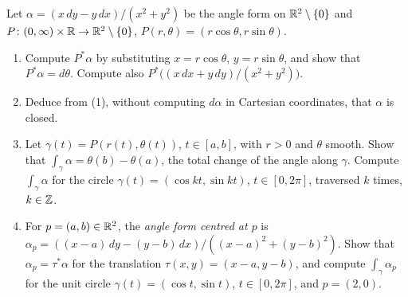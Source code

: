 \begin{exercise}\label{differential-forms:exercise-angle-form-polar}
Let $\alpha = (x\,dy - y\,dx)/(x^2 + y^2)$ be the angle form on $\mathbb{R}^2 \setminus \{0\}$ and $P \colon (0, \infty) \times \mathbb{R} \to \mathbb{R}^2 \setminus \{0\}$, $P(r, \theta) = (r\cos\theta, r\sin\theta)$.
\begin{enumerate}
\item Compute $P^*\alpha$ by substituting $x = r\cos\theta$, $y = r\sin\theta$, and show that $P^*\alpha = d\theta$. Compute also $P^*\bigl((x\,dx + y\,dy)/(x^2 + y^2)\bigr)$.
\item Deduce from (1), without computing $d\alpha$ in Cartesian coordinates, that $\alpha$ is closed.
\item Let $\gamma(t) = P(r(t), \theta(t))$, $t \in [a, b]$, with $r > 0$ and $\theta$ smooth. Show that $\int_\gamma\alpha = \theta(b) - \theta(a)$, the total change of the angle along $\gamma$. Compute $\int_\gamma\alpha$ for the circle
$\gamma(t) = (\cos kt, \sin kt)$, $t \in [0, 2\pi]$, traversed $k$ times, $k \in \mathbb{Z}$.
\item For $p = (a, b) \in \mathbb{R}^2$, the \emph{angle form centred at $p$} is $\alpha_p = ((x - a)\,dy - (y - b)\,dx)/((x - a)^2 + (y - b)^2)$. Show that $\alpha_p = \tau^*\alpha$ for the translation $\tau(x, y) = (x - a, y - b)$, and compute
$\int_\gamma\alpha_p$ for the unit circle $\gamma(t) = (\cos t, \sin t)$, $t \in [0, 2\pi]$, and $p = (2, 0)$.
\end{enumerate}
\end{exercise}

